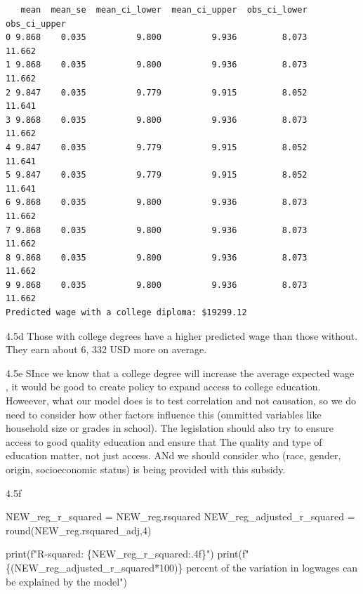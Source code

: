 \documentclass[
  11pt,
  letterpaper,
  DIV=11,
  numbers=noendperiod]{scrartcl}
\newenvironment{Shaded}{\begin{snugshade}}{\end{snugshade}}
\newcommand{\BuiltInTok}[1]{\textcolor[rgb]{0.00,0.23,0.31}{#1}}
\newcommand{\DecValTok}[1]{\textcolor[rgb]{0.68,0.00,0.00}{#1}}
\newcommand{\NormalTok}[1]{\textcolor[rgb]{0.00,0.23,0.31}{#1}}
\newcommand{\OperatorTok}[1]{\textcolor[rgb]{0.37,0.37,0.37}{#1}}
\newcommand{\SpecialCharTok}[1]{\textcolor[rgb]{0.37,0.37,0.37}{#1}}
\newcommand{\SpecialStringTok}[1]{\textcolor[rgb]{0.13,0.47,0.30}{#1}}
\begin{document}
\begin{verbatim}
   mean  mean_se  mean_ci_lower  mean_ci_upper  obs_ci_lower  obs_ci_upper
0 9.868    0.035          9.800          9.936         8.073        11.662
1 9.868    0.035          9.800          9.936         8.073        11.662
2 9.847    0.035          9.779          9.915         8.052        11.641
3 9.868    0.035          9.800          9.936         8.073        11.662
4 9.847    0.035          9.779          9.915         8.052        11.641
5 9.847    0.035          9.779          9.915         8.052        11.641
6 9.868    0.035          9.800          9.936         8.073        11.662
7 9.868    0.035          9.800          9.936         8.073        11.662
8 9.868    0.035          9.800          9.936         8.073        11.662
9 9.868    0.035          9.800          9.936         8.073        11.662
Predicted wage with a college diploma: $19299.12
\end{verbatim}

4.5d Those with college degrees have a higher predicted wage than those
without. They earn about 6, 332 USD more on average.

4.5e SInce we know that a college degree will increase the average
expected wage , it would be good to create policy to expand access to
college education. Howeever, what our model does is to test correlation
and not causation, so we do need to consider how other factors influence
this (ommitted variables like household size or grades in school). The
legislation should also try to ensure access to good quality education
and ensure that The quality and type of education matter, not just
access. ANd we should consider who (race, gender, origin, socioeconomic
status) is being provided with this subsidy.

4.5f

\begin{Shaded}
\begin{Highlighting}[]
\NormalTok{NEW\_reg\_r\_squared }\OperatorTok{=}\NormalTok{ NEW\_reg.rsquared}
\NormalTok{NEW\_reg\_adjusted\_r\_squared }\OperatorTok{=} \BuiltInTok{round}\NormalTok{(NEW\_reg.rsquared\_adj,}\DecValTok{4}\NormalTok{)}

\BuiltInTok{print}\NormalTok{(}\SpecialStringTok{f"R{-}squared: }\SpecialCharTok{\{}\NormalTok{NEW\_reg\_r\_squared}\SpecialCharTok{:.4f\}}\SpecialStringTok{"}\NormalTok{)}
\BuiltInTok{print}\NormalTok{(}\SpecialStringTok{f"}\SpecialCharTok{\{}\NormalTok{(NEW\_reg\_adjusted\_r\_squared}\OperatorTok{*}\DecValTok{100}\NormalTok{)}\SpecialCharTok{\}}\SpecialStringTok{ percent of the variation in logwages can be explained by the model"}\NormalTok{)}
\end{Highlighting}
\end{Shaded}
\end{document}
